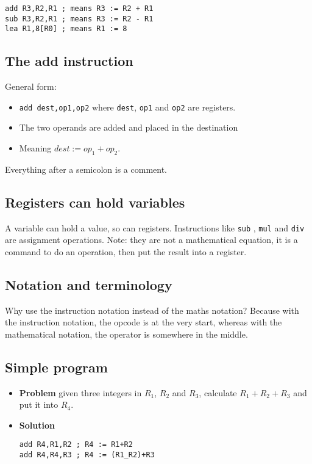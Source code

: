 \begin{verbatim}
add R3,R2,R1 ; means R3 := R2 + R1
sub R3,R2,R1 ; means R3 := R2 - R1
lea R1,8[R0] ; means R1 := 8
\end{verbatim}

\subsection{The add instruction}\label{sub:the_add_instruction}

General form:
\begin{itemize}
	\item \texttt{add dest,op1,op2} where \texttt{dest}, \texttt{op1} and \texttt{op2} are registers.
	\item The two operands are added and placed in the destination
	\item Meaning \(dest:=op_1+op_2\).
\end{itemize}

Everything after a semicolon is a comment.

\subsection{Registers can hold variables}\label{sub:registers_can_hold_variables}

A variable can hold a value, so can registers.
Instructions like \texttt{sub} , \texttt{mul} and \texttt{div} are assignment operations.
Note: they are not a mathematical equation, it is a command to do an operation, then put the result into a register.

\subsection{Notation and terminology}\label{sub:notation_and_terminology}

Why use the instruction notation instead of the maths notation? Because with the instruction notation, the opcode is at the very start, whereas with the mathematical notation, the operator is somewhere in the middle.

\subsection{Simple program}\label{sub:simple_program}

\begin{itemize}
	\item \textbf{Problem} given three integers in \(R_1\), \(R_2\) and \(R_3\), calculate  \(R_1+R_2+R_3\) and put it into \(R_4\).
	\item \textbf{Solution}
	      \begin{verbatim}
add R4,R1,R2 ; R4 := R1+R2
add R4,R4,R3 ; R4 := (R1_R2)+R3
            \end{verbatim}
\end{itemize}

